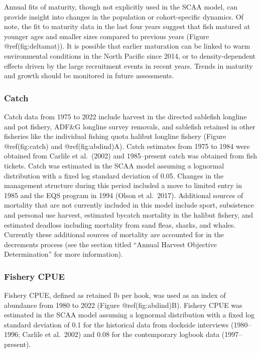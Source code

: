 \documentclass[
]{article}
\begin{document}
Annual fits of maturity, though not explicitly used in the SCAA model,
can provide insight into changes in the population or cohort-specific
dynamics. Of note, the fit to maturity data in the last four years
suggest that fish matured at younger ages and smaller sizes compared to
previous years (Figure @ref(fig:deltamat)). It is possible that earlier
maturation can be linked to warm environmental conditions in the North
Pacific since 2014, or to density-dependent effects driven by the large
recruitment events in recent years. Trends in maturity and growth should
be monitored in future assessments.

\hypertarget{catch}{%
\subsubsection{Catch}\label{catch}}

Catch data from 1975 to 2022 include harvest in the directed sablefish
longline and pot fishery, ADF\&G longline survey removals, and sablefish
retained in other fisheries like the individual fishing quota halibut
longline fishery (Figure @ref(fig:catch) and @ref(fig:abdind)A). Catch
estimates from 1975 to 1984 were obtained from Carlile et al.~(2002) and
1985--present catch was obtained from fish tickets. Catch was estimated
in the SCAA model assuming a lognormal distribution with a fixed log
standard deviation of 0.05. Changes in the management structure during
this period included a move to limited entry in 1985 and the EQS program
in 1994 (Olson et al.~2017). Additional sources of mortality that are
not currently included in this model include sport, subsistence and
personal use harvest, estimated bycatch mortality in the halibut
fishery, and estimated deadloss including mortality from sand fleas,
sharks, and whales. Currently these additional sources of mortality are
accounted for in the decrements process (see the section titled ``Annual
Harvest Objective Determination'' for more information).

\hypertarget{fishery-cpue}{%
\subsubsection{Fishery CPUE}\label{fishery-cpue}}

Fishery CPUE, defined as retained lb per hook, was used as an index of
abundance from 1980 to 2022 (Figure @ref(fig:abdind)B). Fishery CPUE was
estimated in the SCAA model assuming a lognormal distribution with a
fixed log standard deviation of 0.1 for the historical data from
dockside interviews (1980--1996; Carlile et al.~2002) and 0.08 for the
contemporary logbook data (1997--present).
\end{document}
